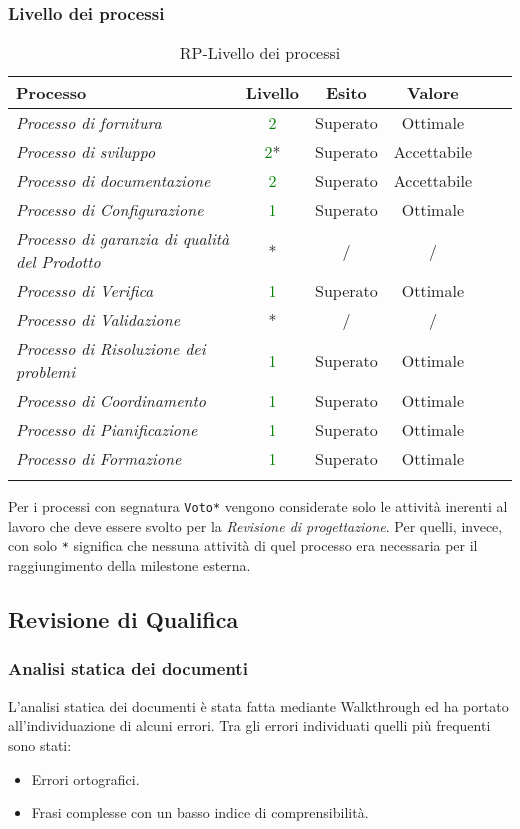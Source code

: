 \subsubsection{Livello dei processi}
\begin{longtable}{|>{\centering}m{6cm}|c|c|c|c|c|}
\hline
\textbf{Processo} & \textbf{Livello} & \textbf{Esito} & \textbf{Valore}\\
\hline
\endhead
\emph{Processo di fornitura} & \textcolor{Green}{2} & Superato & Ottimale\\ \hline
\emph{Processo di sviluppo} & \textcolor{Green}{2}* & Superato & Accettabile\\ \hline
\emph{Processo di documentazione} & \textcolor{Green}{2} & Superato & Accettabile\\ 
\hline
\emph{Processo di Configurazione} & \textcolor{Green}{1} & Superato & Ottimale\\ 
\hline
\emph{Processo di garanzia di qualità del Prodotto} & * & / & /\\ 
\hline
\emph{Processo di Verifica} & \textcolor{Green}{1} & Superato & Ottimale\\ 
\hline
\emph{Processo di Validazione} & * & / & /\\ 
\hline
\emph{Processo di Risoluzione dei problemi} & \textcolor{Green}{1} & Superato & Ottimale\\ 
\hline
\emph{Processo di Coordinamento} & \textcolor{Green}{1} & Superato & Ottimale\\ 
\hline
\emph{Processo di Pianificazione} & \textcolor{Green}{1} & Superato & Ottimale\\ 
\hline
\emph{Processo di Formazione} & \textcolor{Green}{1} & Superato & Ottimale\\ 
\hline
\caption{RP-Livello dei processi}
\end{longtable}

Per i processi con segnatura \texttt{Voto*} vengono considerate solo le attività inerenti al lavoro che deve essere svolto per la \textit{Revisione di progettazione}. Per quelli, invece, con solo \texttt{*} significa che nessuna attività di quel processo era necessaria per il raggiungimento della milestone esterna.

\newpage

\subsection{Revisione di Qualifica}

\subsubsection{Analisi statica dei documenti}
L'analisi statica dei documenti è stata fatta mediante Walkthrough ed ha portato all'individuazione di alcuni errori. Tra gli errori individuati quelli più frequenti sono stati:
		\begin{itemize}
			\item Errori ortografici.
			\item Frasi complesse con un basso indice di comprensibilità.
		\end{itemize}


